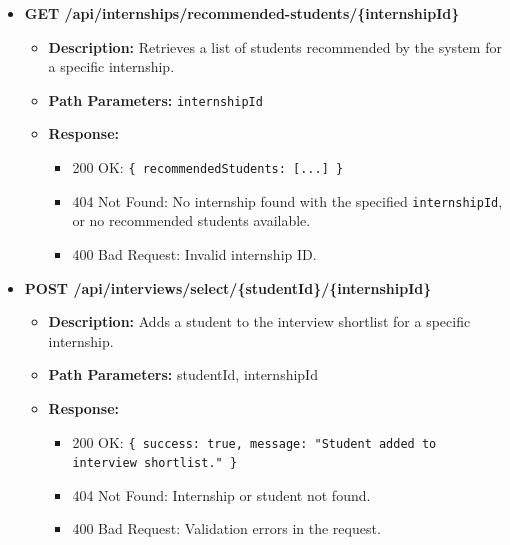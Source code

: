 \begin{itemize}
    \item \textbf{GET /api/internships/recommended-students/\{internshipId\}}  
    \begin{itemize}
        \item \textbf{Description:} Retrieves a list of students recommended by the system for a specific internship.
        \item \textbf{Path Parameters:} \texttt{internshipId}
        \item \textbf{Response:}
        \begin{itemize}
            \item 200 OK: \texttt{\{ recommendedStudents: [...] \}}
            \item 404 Not Found: No internship found with the specified \texttt{internshipId}, or no recommended students available.
            \item 400 Bad Request: Invalid internship ID.
        \end{itemize}
    \end{itemize}



    \item \textbf{POST /api/interviews/select/\{studentId\}/\{internshipId\}}  
    \begin{itemize}
        \item \textbf{Description:} Adds a student to the interview shortlist for a specific internship.
        \item \textbf{Path Parameters:} studentId, internshipId  
        \item \textbf{Response:}
        \begin{itemize}
            \item 200 OK: \texttt{\{ success: true, message: "Student added to interview shortlist." \}}
            \item 404 Not Found: Internship or student not found.
            \item 400 Bad Request: Validation errors in the request.
        \end{itemize}
    \end{itemize}




\end{itemize}
